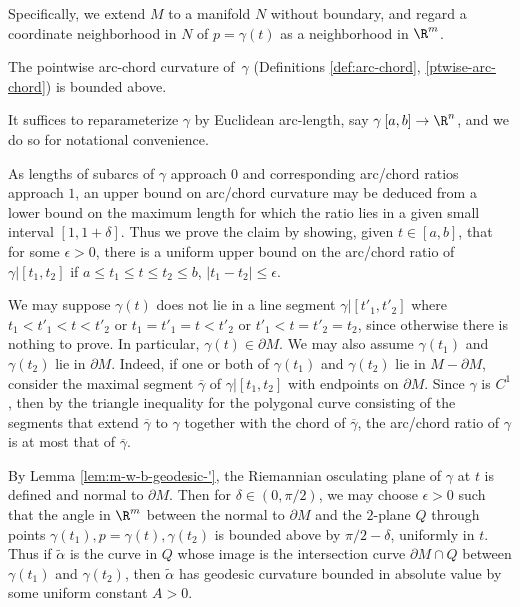 Specifically,  we extend $M$ to a manifold $N$ without boundary, and regard a  coordinate neighborhood in $N$ of $p=\gamma(t)$ as a neighborhood  in $\R^m$.

\begin{clm}{}\label{clm:pointwise-k-bound}
The pointwise arc-chord curvature  of  $\,\gamma$ (Definitions \ref{def:arc-chord}, \ref{ptwise-arc-chord}) is bounded above.
\end{clm}
It suffices to reparameterize $\gamma$ by Euclidean arc-length, say $\gamma\:[a,b]\to \R^n$, and we do so for notational convenience. 

As lengths of subarcs of $\gamma$ approach $0$ and corresponding arc/chord ratios approach $1$, an upper bound on arc/chord curvature may be deduced from a lower bound on the maximum length for which the ratio lies in a given small interval $[1,1+\delta]$.    Thus we prove the claim by showing,  given $t\in [a,b]$,  that for some  $\epsilon>0$, there is a uniform upper bound on the arc/chord ratio of $\gamma|[t_1,t_2]$ if  $a\le t_1\le t\le t_2\le b$, $|t_1-t_2|\le \epsilon$. 

We may suppose  $\gamma(t)$  does not lie in a line segment $\gamma|[t'_1,t'_2]$ where  $t_1< t'_1< t< t'_2$ or $t_1=t'_1= t< t'_2$ or $ t'_1< t= t'_2=t_2$,  since otherwise there is nothing to prove. In particular, $\gamma(t)\in\partial M$. We may also assume $\gamma(t_1)$ and $\gamma(t_2)$ lie in $\partial M$. Indeed, if one or both of $\gamma(t_1)$ and $\gamma(t_2)$ lie in $M-\partial M$, consider the maximal segment $\overline{\gamma}$ of $\gamma|[t_1,t_2]$ with endpoints on $\partial M$.  Since $\gamma$ is $C^1$, then by the triangle inequality for the polygonal curve consisting of the segments that extend $\overline{\gamma}$  to $\gamma$ together with the chord of $\overline{\gamma}$,  the arc/chord ratio of $\gamma$ is at most that of $\overline{\gamma}$.



By Lemma \ref{lem:m-w-b-geodesic-'}, the 
Riemannian osculating plane of $\gamma$ at $t$ is defined and normal to $\partial M$.
Then for $\delta\in (0,\pi/2)$, we may choose $\epsilon>0$  such that  the  angle  in $\R^m$ between the normal to $\partial M$ and the $2$-plane $Q$ through points $\gamma(t_1), p=\gamma(t), \gamma(t_2)$ is bounded above by $\pi/2-\delta$, uniformly in $t$. Thus if $\tilde\alpha$ is the curve in $Q$  whose image is the intersection curve $\partial M\cap Q$ 
between $\gamma(t_1)$ and $\gamma(t_2)$, then  $\tilde\alpha$ has  geodesic curvature bounded in absolute value by some uniform constant $A>0$.

